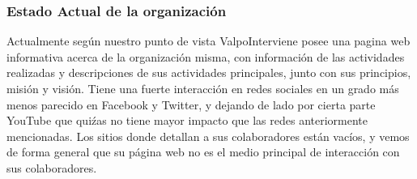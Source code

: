 \documentclass[paper=letter, fontsize=11pt]{scrartcl} %
\numberwithin{equation}{section} %
\numberwithin{figure}{section} %
\numberwithin{table}{section} %
\begin{document}
\subsubsection*{Estado Actual de la organización}
Actualmente según nuestro punto de vista ValpoInterviene posee una pagina web informativa acerca de la organización misma, con información de las actividades realizadas y descripciones de sus actividades principales, junto con sus principios, misión y visión.
Tiene una fuerte interacción en redes sociales en un grado más menos parecido en Facebook y Twitter, y dejando de lado por cierta parte YouTube que quiźas no tiene mayor impacto que las redes anteriormente mencionadas. Los sitios donde detallan a sus colaboradores están vacíos, y vemos de forma general que su página web no es el medio principal de interacción con sus colaboradores.



\end{document}

